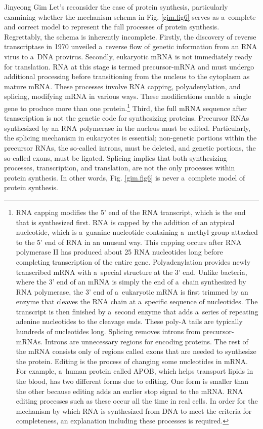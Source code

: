\begin{artengenv}{Jinyeong Gim}
Let's reconsider the case of protein synthesis, particularly examining whether the mechanism schema in Fig. \ref{gim.fig6} serves as a~complete and correct model to represent the full processes of protein synthesis. Regrettably, the schema is inherently incomplete. Firstly, the discovery of reverse transcriptase in 1970 unveiled a~reverse flow of genetic information from an RNA virus to a~DNA provirus. Secondly, eukaryotic mRNA is not immediately ready for translation. RNA at this stage is termed precursor-mRNA and must undergo additional processing before transitioning from the nucleus to the cytoplasm as mature mRNA. These processes involve RNA capping, polyadenylation, and splicing, modifying mRNA in various ways. These modifications enable a~single gene to produce more than one protein.\footnote{RNA capping modifies the 5' end of the RNA transcript, which is the end that is synthesized first. RNA is capped by the addition of an atypical nucleotide, which is a~guanine nucleotide containing a~methyl group attached to the 5' end of RNA in an unusual way. This capping occurs after RNA polymerase II has produced about 25 RNA nucleotides long before completing transcription of the entire gene. Polyadenylation provides newly transcribed mRNA with a~special structure at the 3' end. Unlike bacteria, where the 3' end of an mRNA is simply the end of a~chain synthesized by RNA polymerase, the 3' end of a~eukaryotic mRNA is first trimmed by an enzyme that cleaves the RNA chain at a~specific sequence of nucleotides. The transcript is then finished by a~second enzyme that adds a~series of repeating adenine nucleotides to the cleavage ends. These poly-A tails are typically hundreds of nucleotides long. Splicing removes introns from precursor-mRNAs. Introns are unnecessary regions for encoding proteins. The rest of the mRNA consists only of regions called exons that are needed to synthesize the protein. Editing is the process of changing some nucleotides in mRNA. For example, a~human protein called APOB, which helps transport lipids in the blood, has two different forms due to editing. One form is smaller than the other because editing adds an earlier stop signal to the mRNA. RNA editing processes such as these occur all the time in real cells. In order for the mechanism by which RNA is synthesized from DNA to meet the criteria for completeness, an explanation including these processes is required.} Third, the full mRNA sequence after transcription is not the genetic code for synthesizing proteins. Precursor RNAs synthesized by an RNA polymerase in the nucleus must be edited. Particularly, the splicing mechanism in eukaryotes is essential; non-genetic portions within the precursor RNAs, the so-called introns, must be deleted, and genetic portions, the so-called exons, must be ligated. Splicing implies that both synthesizing processes, transcription, and translation, are not the only processes within protein synthesis. In other words, Fig. \ref{gim.fig6} is never a~complete model of protein synthesis.



\end{artengenv}
